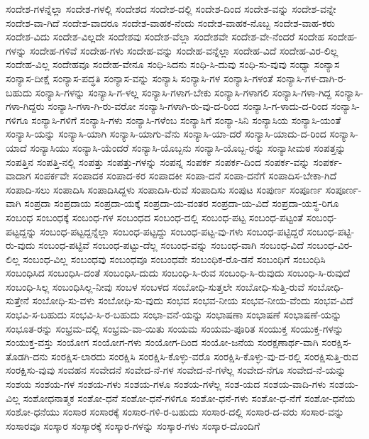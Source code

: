 {ಸಂದೇಶ-ಗಳನ್ನೆಲ್ಲಾ
ಸಂದೇಶ-ಗಳಲ್ಲಿ
ಸಂದೇಶದ
ಸಂದೇಶ-ದಲ್ಲಿ
ಸಂದೇಶ-ದಿಂದ
ಸಂದೇಶ-ವನ್ನು
ಸಂದೇಶ-ವನ್ನೇ
ಸಂದೇಶ-ವಾ-ಗಿದೆ
ಸಂದೇಶ-ವಾದರೂ
ಸಂದೇಶ-ವಾಹಕ-ನೆಂದು
ಸಂದೇಶ-ವಾಹಕ-ನೊಬ್ಬ
ಸಂದೇಶ-ವಾಹ-ಕರು
ಸಂದೇಶ-ವಿದು
ಸಂದೇಶ-ವಿಲ್ಲದೇ
ಸಂದೇಶವು
ಸಂದೇಶ-ವೆಲ್ಲಾ
ಸಂದೇಶವೇ
ಸಂದೇಶ-ವೇ-ನೆಂದರೆ
ಸಂದೇಹ
ಸಂದೇಹ-ಗಳನ್ನು
ಸಂದೇಹ-ಗಳಿವೆ
ಸಂದೇಹ-ಗಳು
ಸಂದೇಹ-ವನ್ನು
ಸಂದೇಹ-ವನ್ನೆಲ್ಲಾ
ಸಂದೇಹ-ವಿದೆ
ಸಂದೇಹ-ವಿರ-ಲಿಲ್ಲ
ಸಂದೇಹ-ವಿಲ್ಲ
ಸಂದೇಹವೂ
ಸಂದೇಹ-ವೇನೂ
ಸಂಧಿ-ಸಿದನು
ಸಂಧಿ-ಸಿ-ದುವು
ಸಂಧಿ-ಸು-ವುವು
ಸಂಧ್ಯಾ
ಸಂನ್ಯಾಸ
ಸಂನ್ಯಾಸ-ದೀಕ್ಷೆ
ಸಂನ್ಯಾಸ-ಪದ್ಧತಿ
ಸಂನ್ಯಾಸ-ವನ್ನು
ಸಂನ್ಯಾಸಿ
ಸಂನ್ಯಾಸಿ-ಗಳ
ಸಂನ್ಯಾಸಿ-ಗಳಂತೆ
ಸಂನ್ಯಾಸಿ-ಗಳ-ದಾಗಿ-ರ-ಬಹುದು
ಸಂನ್ಯಾಸಿ-ಗಳನ್ನು
ಸಂನ್ಯಾಸಿ-ಗ-ಳಲ್ಲ
ಸಂನ್ಯಾಸಿ-ಗಳಾಗ-ಬೇಕು
ಸಂನ್ಯಾಸಿ-ಗಳಾಗಲಿ
ಸಂನ್ಯಾಸಿ-ಗಳಾ-ಗಿದ್ದ
ಸಂನ್ಯಾಸಿ-ಗಳಾ-ಗಿದ್ದರು
ಸಂನ್ಯಾಸಿ-ಗಳಾ-ಗಿ-ರು-ವರೋ
ಸಂನ್ಯಾಸಿ-ಗಳಾಗಿ-ರು-ವು-ದ-ರಿಂದ
ಸಂನ್ಯಾಸಿ-ಗ-ಳಾದು-ದ-ರಿಂದ
ಸಂನ್ಯಾಸಿ-ಗಳಿಗೂ
ಸಂನ್ಯಾಸಿ-ಗಳಿಗೆ
ಸಂನ್ಯಾಸಿ-ಗಳು
ಸಂನ್ಯಾಸಿ-ಗಳೆಂಬ
ಸಂನ್ಯಾಸಿಗೆ
ಸಂನ್ಯಾ-ಸಿನಿ
ಸಂನ್ಯಾಸಿಯ
ಸಂನ್ಯಾಸಿ-ಯಂತೆ
ಸಂನ್ಯಾಸಿ-ಯನ್ನು
ಸಂನ್ಯಾಸಿ-ಯಾಗಿ
ಸಂನ್ಯಾಸಿ-ಯಾಗು-ವೆನು
ಸಂನ್ಯಾಸಿ-ಯಾ-ದರೆ
ಸಂನ್ಯಾಸಿ-ಯಾದು-ದ-ರಿಂದ
ಸಂನ್ಯಾಸಿ-ಯಾದೆ
ಸಂನ್ಯಾಸಿಯು
ಸಂನ್ಯಾಸಿ-ಯೆಂದರೆ
ಸಂನ್ಯಾಸಿ-ಯೊಬ್ಬನು
ಸಂನ್ಯಾಸಿ-ಯೊಬ್ಬ-ರನ್ನು
ಸಂನ್ಯಾಸೀಮಠ
ಸಂಪತ್ತನ್ನು
ಸಂಪತ್ತಿನ
ಸಂಪತ್ತಿ-ನಲ್ಲಿ
ಸಂಪತ್ತು
ಸಂಪತ್ತು-ಗಳನ್ನು
ಸಂಪನ್ನ
ಸಂಪರ್ಕ
ಸಂಪರ್ಕ-ದಿಂದ
ಸಂಪರ್ಕ-ವನ್ನು
ಸಂಪರ್ಕ-ವಾದಾಗ
ಸಂಪರ್ಕವೇ
ಸಂಪಾದಕ
ಸಂಪಾದ-ಕರ
ಸಂಪಾದಕೀ
ಸಂಪಾ-ದನೆ
ಸಂಪಾ-ದನೆಗೆ
ಸಂಪಾದಿಸ-ಬೇಕಾ-ಗಿದೆ
ಸಂಪಾದಿ-ಸಲು
ಸಂಪಾದಿಸಿ
ಸಂಪಾದಿಸಿದ್ದಳು
ಸಂಪಾದಿಸಿ-ರುವೆ
ಸಂಪಾದಿಸು
ಸಂಪುಟ
ಸಂಪುರ್ಣ
ಸಂಪೂರ್ಣ
ಸಂಪೂರ್ಣ-ವಾಗಿ
ಸಂಪ್ರದಾ
ಸಂಪ್ರದಾಯ
ಸಂಪ್ರದಾ-ಯಕ್ಕೆ
ಸಂಪ್ರದಾ-ಯ-ವಂತರ
ಸಂಪ್ರದಾ-ಯ-ವಿದೆ
ಸಂಪ್ರದಾ-ಯಸ್ಥ-ರಿಗೂ
ಸಂಬಂಧ
ಸಂಬಂಧಕ್ಕೆ
ಸಂಬಂಧ-ಗಳ
ಸಂಬಂಧದ
ಸಂಬಂಧ-ದಲ್ಲಿ
ಸಂಬಂಧ-ಪಟ್ಟ
ಸಂಬಂಧ-ಪಟ್ಟಂತೆ
ಸಂಬಂಧ-ಪಟ್ಟದ್ದನ್ನು
ಸಂಬಂಧ-ಪಟ್ಟದ್ದನ್ನೆಲ್ಲಾ
ಸಂಬಂಧ-ಪಟ್ಟದ್ದು
ಸಂಬಂಧ-ಪಟ್ಟ-ವು-ಗಳು
ಸಂಬಂಧ-ಪಟ್ಟಿದ್ದರೆ
ಸಂಬಂಧ-ಪಟ್ಟಿ-ರು-ವುದು
ಸಂಬಂಧ-ಪಟ್ಟಿವೆ
ಸಂಬಂಧ-ಪಟ್ಟು-ದೆಲ್ಲ
ಸಂಬಂಧ-ವನ್ನು
ಸಂಬಂಧ-ವಾಗಿ
ಸಂಬಂಧ-ವಿದೆ
ಸಂಬಂಧ-ವಿರ-ಲಿಲ್ಲ
ಸಂಬಂಧ-ವಿಲ್ಲ
ಸಂಬಂಧವು
ಸಂಬಂಧವೂ
ಸಂಬಂಧವೇ
ಸಂಬಂಧಿಕ-ರೊ-ಡನೆ
ಸಂಬಂಧಿಗೆ
ಸಂಬಂಧಿಸಿ
ಸಂಬಂಧಿಸಿದ
ಸಂಬಂಧಿಸಿ-ದಂತೆ
ಸಂಬಂಧಿಸಿ-ದುದು
ಸಂಬಂಧಿ-ಸಿ-ರುವ
ಸಂಬಂಧಿ-ಸಿ-ರುವುದು
ಸಂಬಂಧಿ-ಸಿ-ರುವುದೆ
ಸಂಬಂಧಿ-ಸಿಲ್ಲ
ಸಂಬಂಧಿಸಿಲ್ಲ-ನೀವು
ಸಂಬಳ
ಸಂಬಳದ
ಸಂಬೋಧಿ-ಸುತ್ತಲೇ
ಸಂಬೋಧಿ-ಸುತ್ತಿ-ರುವೆ
ಸಂಬೋಧಿ-ಸುತ್ತೇನೆ
ಸಂಬೋಧಿ-ಸು-ವಳು
ಸಂಬೋಧಿ-ಸು-ವುದು
ಸಂಭವ
ಸಂಭವ-ನೀಯ
ಸಂಭವ-ನೀಯ-ವೆಂದು
ಸಂಭವ-ವಿದೆ
ಸಂಭವಿ-ಸ-ಬಹುದು
ಸಂಭವಿ-ಸಿ-ರ-ಬಹುದು
ಸಂಭಾ-ವನೆ-ಯನ್ನು
ಸಂಭಾಷಣಾ
ಸಂಭಾಷಣೆ
ಸಂಭಾಷಣೆ-ಯನ್ನು
ಸಂಭೂತ-ರನ್ನು
ಸಂಭ್ರಮ-ದಲ್ಲಿ
ಸಂಭ್ರಮ-ವಾ-ಯಿತು
ಸಂಯಮ
ಸಂಯಮ-ಪೂರಿತ
ಸಂಯುಕ್ತ
ಸಂಯುಕ್ತ-ಗಳನ್ನು
ಸಂಯುಕ್ತ-ವಸ್ತು
ಸಂಯೋಗ
ಸಂಯೋಗ-ಗಳು
ಸಂಯೋಗ-ದಿಂದ
ಸಂಯೋ-ಜನೆಯ
ಸಂರಕ್ಷಣಾರ್ಥ-ವಾಗಿ
ಸಂರಕ್ಷಿಸ-ತೊಡಗಿ-ದನು
ಸಂರಕ್ಷಿಸ-ಲಾರದು
ಸಂರಕ್ಷಿಸಿ
ಸಂರಕ್ಷಿಸಿ-ಕೊಳ್ಳು-ವರೊ
ಸಂರಕ್ಷಿಸಿ-ಕೊಳ್ಳು-ವು-ದ-ರಲ್ಲಿ
ಸಂರಕ್ಷಿಸುತ್ತಿ-ರುವ
ಸಂರಕ್ಷಿಸು-ವುವು
ಸಂವಹನ
ಸಂವೇದನೆ
ಸಂವೇದ-ನೆ-ಗಳ
ಸಂವೇದ-ನೆ-ಗಳೆಲ್ಲ
ಸಂವೇದ-ನೆಗೂ
ಸಂವೇದ-ನೆ-ಯನ್ನು
ಸಂಶಯ
ಸಂಶಯ-ಗಳ
ಸಂಶಯ-ಗಳು
ಸಂಶಯ-ಗಳೂ
ಸಂಶಯ-ಗಳೆಲ್ಲ
ಸಂಶ-ಯದ
ಸಂಶಯ-ವಾದಿ-ಗಳು
ಸಂಶಯ-ವಿಲ್ಲ
ಸಂಶೋಧನಾತ್ಮಕ
ಸಂಶೋ-ಧನೆ
ಸಂಶೋ-ಧನೆ-ಗಳಿಗೂ
ಸಂಶೋ-ಧನೆ-ಗಳು
ಸಂಶೋ-ಧ-ನೆಗೆ
ಸಂಶೋ-ಧನೆಯ
ಸಂಶೋ-ಧನೆಯು
ಸಂಸಾರ
ಸಂಸಾರಕ್ಕೆ
ಸಂಸಾರ-ಗಳಿ-ರ-ಬಹುದು
ಸಂಸಾರ-ದಲ್ಲಿ
ಸಂಸಾರ-ದ-ವರು
ಸಂಸಾರ-ವನ್ನು
ಸಂಸಾರವೂ
ಸಂಸ್ಕಾರ
ಸಂಸ್ಕಾರಕ್ಕೆ
ಸಂಸ್ಕಾರ-ಗಳನ್ನು
ಸಂಸ್ಕಾರ-ಗಳು
ಸಂಸ್ಕಾರ-ದೊಂದಿಗೆ
}
